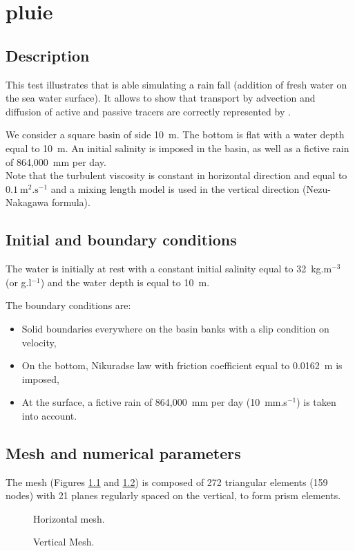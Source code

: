 \chapter{pluie}

\section{Description}
\bigskip
This test illustrates that  is able simulating a rain fall
(addition of fresh water on the sea water surface).
It allows to show that transport by advection and diffusion of active
and passive tracers are correctly represented by .

\bigskip
We consider a square basin of side 10~m. The bottom is flat with a water
depth equal to 10~m.
An initial salinity is imposed in the basin, as well as a fictive rain of 864,000~mm per day.\\
Note that the turbulent viscosity is constant in horizontal direction
and equal to $0.1~\text{m}^2.\text{s}^{-1}$ and a mixing length model is
used in the vertical direction (Nezu-Nakagawa formula).


\section{Initial and boundary conditions}
\bigskip
The water is initially at rest with a constant initial salinity equal
to 32~kg.m$^{-3}$ (or g.l$^{-1}$) and the water depth is equal to 10~m.

\bigskip
The boundary conditions are:
\begin{itemize}
\item Solid boundaries everywhere on the basin banks with a slip condition on velocity,
\item On the bottom, Nikuradse law with friction coefficient equal to
0.0162~m is imposed,
\item At the surface, a fictive rain of 864,000~mm per day (10~mm.s$^{-1}$)
is taken into account.
\end{itemize}
%
\section{Mesh and numerical parameters}
\bigskip
The mesh (Figures \ref{t3d:pluie:fig:meshH} and \ref{t3d:pluie:fig:meshV})
is composed of 272 triangular elements (159 nodes) with 21 planes
regularly spaced on the vertical, to form prism elements.

\begin{figure}[!htbp]
 \centering
 \caption{Horizontal mesh.}
 \label{t3d:pluie:fig:meshH}
\end{figure}
\begin{figure}[!htbp]
 \centering
 \caption{Vertical Mesh.}
 \label{t3d:pluie:fig:meshV}
\end{figure}

